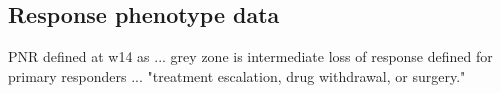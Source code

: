 \begin{outline}

\subsection{Response phenotype data}


%


\1 PNR defined at w14 as ...
    \2 grey zone is intermediate
    \2 loss of response defined for primary responders ... "treatment escalation, drug withdrawal, or surgery."



\end{outline}
